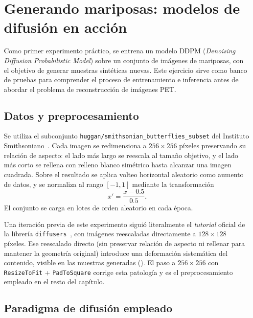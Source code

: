 \chapter{Generando mariposas: modelos de difusión en acción}
\label{cap:mariposas}

Como primer experimento práctico, se entrena un modelo DDPM
(\textit{Denoising Diffusion Probabilistic Model}) sobre un
conjunto de imágenes de mariposas, con el objetivo de generar
muestras sintéticas nuevas. Este ejercicio sirve como banco de
pruebas para comprender el proceso de entrenamiento e inferencia
antes de abordar el problema de reconstrucción de imágenes PET.

\section{Datos y preprocesamiento}
\label{sec:mariposas-datos}

Se utiliza el subconjunto \texttt{huggan/smithsonian\_butterflies\_subset}
del Instituto Smithsoniano~\cite{smithsonianbutterflies}. Cada imagen se redimensiona a
$256 \times 256$ píxeles preservando su relación de aspecto: el
lado más largo se reescala al tamaño objetivo, y el lado más corto
se rellena con relleno blanco simétrico hasta alcanzar una imagen
cuadrada. Sobre el resultado se aplica volteo horizontal
aleatorio como aumento de datos, y se normaliza al rango $[-1, 1]$
mediante la transformación
\begin{equation}
    x' = \frac{x - 0.5}{0.5}.
\end{equation}
El conjunto se carga en lotes de orden aleatorio en cada época.

Una iteración previa de este experimento siguió literalmente el
\textit{tutorial} oficial de la librería
\texttt{diffusers}~\cite{diffuserstutorial}, con
imágenes reescaladas directamente a $128 \times 128$ píxeles. Ese
reescalado directo (sin preservar relación de aspecto ni rellenar
para mantener la geometría original) introduce una deformación
sistemática del contenido, visible en las muestras generadas
(). El paso a $256 \times 256$ con
\texttt{ResizeToFit} + \texttt{PadToSquare} corrige esta patología
y es el preprocesamiento empleado en el resto del capítulo.

\section{Paradigma de difusión empleado}
\label{sec:mariposas-paradigma}

